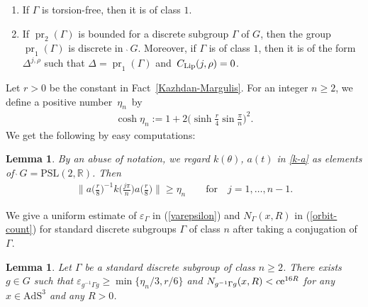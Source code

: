 \documentclass[pdftex]{sigma}
\numberwithin{equation}{section}
\newtheorem{Lemma}[Theorem]{Lemma}
\begin{document}
{\samepage\begin{Remark}\quad
\begin{enumerate}\itemsep=0pt
\item[(1)]
If $\Gamma$ is torsion-free, then it is of class $1$.
\item[(2)]
If $\operatorname{pr}_{2}(\Gamma)$ is bounded
for a discrete subgroup $\Gamma$ of $G$, then
the group $\operatorname{pr}_{1}(\Gamma)$ is discrete
in~$\grave{\ }G$.
Moreover, if $\Gamma$ is of class $1$, then it is of the form $\Delta^{j,\rho}$
such that $\Delta = \operatorname{pr}_{1}(\Gamma)$ and~$C_{\rm Lip}(j,\rho)=0$.
\end{enumerate}
\end{Remark}

}

Let $r>0$ be the constant in Fact~\ref{Kazhdan-Margulis}.
For an integer $n \geq 2$,
we define a positive num\-ber~$\eta_{n}$~by
\begin{gather*}
\cosh \eta_{n} :=1+2\bigg(\sinh \frac{r}{4} \sin \frac{\pi}{n}\bigg)^{2}.
\end{gather*}
We get the following by easy computations:
\begin{Lemma}
\label{computation}
By an abuse of notation, we regard $k(\theta)$, $a(t)$ in \eqref{k-a}
as elements of $\grave{\ }G=\mathrm{PSL}(2,\mathbb{R})$. Then
\begin{gather*}
\bigg\|a\bigg(\frac{r}{8}\bigg)^{-1}k\bigg(\frac{j\pi}{n}\bigg)a\bigg(\frac{r}{8}\bigg)\bigg\| \geq \eta_{n}\qquad
\text{for}\quad j=1,\ldots,n-1.
\end{gather*}
\end{Lemma}

We give a uniform estimate of $\varepsilon_{\Gamma}$ in (\ref{varepsilon})
and $N_{\Gamma}(x,R)$ in (\ref{orbit-count})
for standard discrete subgroups $\Gamma$ of class $n$
after taking a conjugation of $\Gamma$.

\begin{Lemma}
\label{n-standard}
Let $\Gamma$ be a standard discrete subgroup of class $n \geq 2$.
There exists $g\in G$ such that
$\varepsilon_{g^{-1}\Gamma g}\geq\operatorname{min}\{\eta_n/3,r/6\}$
and $N_{g^{-1}\Gamma g}(x,R)<c{\rm e}^{16R}$ for any $x\in \mathrm{AdS}^{3}$ and any $R>0$.
\end{Lemma}
\end{document}
